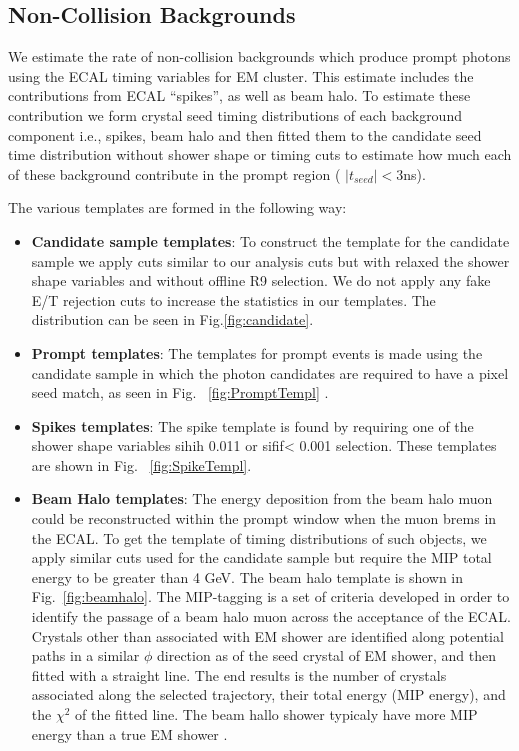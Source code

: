 \subsection{Non-Collision Backgrounds}
\label{sec:noncollision}

We estimate the rate of non-collision backgrounds which produce prompt photons using the ECAL timing variables for EM cluster. This estimate includes the contributions from ECAL “spikes”, as well as beam halo. To estimate these contribution we form crystal seed timing distributions of each background component i.e., spikes, beam halo and then fitted them to the candidate seed time distribution without shower shape or timing cuts to estimate how much each of these background contribute in the prompt region (  $|t_{seed} | < 3 $ns).

 The various templates are formed in the following way: 
    
\begin{itemize}
\item {\bf Candidate sample templates}: To construct the template for the candidate sample we apply cuts similar to our analysis cuts but with relaxed the shower shape variables and without offline R9 selection. We do not apply any fake E/T rejection cuts to increase the statistics in our templates. The distribution can be seen in Fig.\ref{fig:candidate}.
\item {\bf Prompt templates}: The templates for prompt events is made using the candidate sample in which the photon candidates are required to have a pixel seed match, as seen in Fig. ~\ref{fig:PromptTempl} .
\item {\bf Spikes templates}: The spike template is found by requiring one of the shower shape variables sihih 0.011 or sifif< 0.001 selection. These templates are shown in Fig. ~\ref{fig:SpikeTempl}.
\item {\bf Beam Halo templates}: The energy deposition from the beam halo muon could be reconstructed within the prompt window when the muon brems in the ECAL. To get the template of timing distributions of such objects, we apply similar cuts used for the candidate sample but require the MIP total energy to be greater than 4 GeV. The beam halo template is shown in Fig.~\ref{fig:beamhalo}. The MIP-tagging is a set of criteria developed in order to identify the passage of a beam halo muon across the acceptance of the ECAL. Crystals other than associated with EM shower  are identified along potential paths in a similar $\phi$ direction as of the seed crystal of EM shower, and then fitted with a straight line. The end results is the number of crystals associated along the selected trajectory, their total energy (MIP energy), and the $\chi^2$ of the fitted line. The beam hallo shower typicaly have more MIP energy than a true EM shower .
\end{itemize}



